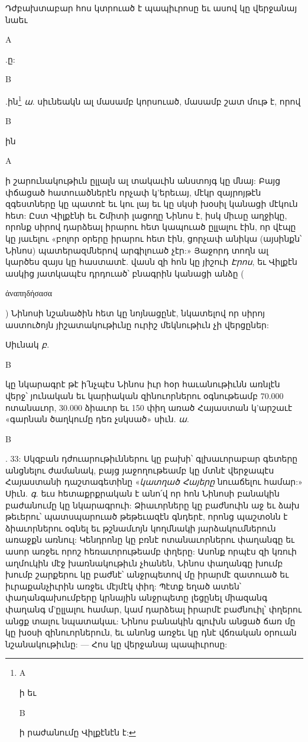 \documentclass{article}
\begin{document}
{Դժբախտաբար հոս կտրուած է պապիւրոսը եւ ասով կը վերջանայ նաեւ \begin{greek}Α\end{greek}.ը: \begin{greek}Β\end{greek}.ին\footnote{\begin{greek}Α\end{greek}ի եւ \begin{greek}Β\end{greek}ի րաժանումը Վիլքէնէն է:} \emph{ա}. սիւնեակն ալ մասամբ կորսուած, մասամբ շատ մութ է, որով \begin{greek}Β\end{greek}ին \begin{greek}Α\end{greek}ի շարունակութիւն ըլլալն ալ տակաւին անստոյգ կը մնայ: Բայց փճացած հատուածներէն որչափ կ'երեւայ, մէկր զայրոյթէն զգեստները կը պատռէ եւ կու լայ եւ կը սկսի խօսիլ կանացի մէկուն հետ: Ըստ Վիլքէնի եւ Շմիտի լացողը Նինոս է, իսկ միւսը աղջիկը, որոնք սիրով դարձեալ իրարու հետ կապուած ըլլալու էին, որ վէպը կը յաւելու «բոլոր օրերը իրարու հետ էին, ցորչափ անիկա (այսինքն՝ Նինոս) պատերազմներով արգիլուած չէր:» Յաջորդ տողն ալ կարծես զայս կը հաստատէ. վասն զի հոն կը յիշուի \emph{Էրոս}, եւ Վիլքէն ասկից յատկապէս դրդուած՝ բնագրին կանացի անձը (\begin{greek}ἀναπηδήσασα\end{greek}) Նինոսի նշանածին հետ կը նոյնացընէ, նկատելով որ սիրոյ աստուծոյն յիշատակութիւնը ուրիշ մեկնութիւն չի վերցըներ:

Սիւնակ \emph{բ}. \begin{greek}Β\end{greek} կը նկարագրէ թէ ի՛նչպէս Նինոս իւր հօր հաւանութիւնն առնլէն վերջ՝ յունական եւ կարիական զինուորներու օգնութեամբ 70.000 ոտանաւոր, 30.000 ձիաւոր եւ 150 փիղ առած Հայաստան կ'արշաւէ «գարնան ծաղկումը դեռ չսկսած» սիւն. \emph{ա}. \begin{greek}Β\end{greek}. 33: Սկզբան դժուարութիւններու կը բախի՝ գլխաւորաբար գետերը անցնելու ժամանակ, բայց յաջողութեամբ կը մտնէ վերջապէս Հայաստանի դաշտագետինը «\emph{կատղած Հայերը} նուաճելու համար:» Սիւն. \emph{գ}. եւս հետաքրքրական է անո՛վ որ հոն Նինոսի բանակին բաժանումը կը նկարագրուի: Ձիաւորները կը բաժնուին աջ եւ ձախ թեւերու՝ պատսպարուած թեթեւազէն գնդերէ, որոնց պաշտօնն է ձիաւորներու օգնել եւ թշնամւոյն կողմնակի յարձակումներուն առաջքն առնուլ: Կենդրոնը կը բռնէ ոտանաւորներու փաղանգը եւ ասոր առջեւ որոշ հեռաւորութեամբ փղերը: Ասոնք որպէս զի կռուի աղմուկին մէջ խառնակութիւն չհանեն, Նինոս փաղանգը խումբ խումբ շարքերու կը բաժնէ՝ անջրպետով մը իրարմէ զատուած եւ իւրաքանչիւրին առջեւ մէյմէկ փիղ: Պէտք եղած ատեն՝ փաղանգախումբերը կրնային անջրպետը լեցընել միազանգ փաղանգ մ'ըլլալու համար, կամ դարձեալ իրարմէ բաժնուիլ՝ փղերու անցք տալու նպատակաւ: Նինոս բանակին գլուխն անցած ճառ մը կը խօսի զինուորներուն, եւ անոնց առջեւ կը դնէ վճռական օրուան նշանակութիւնը: — Հոս կը վերջանայ պապիւրոսը:

}
\end{document}
